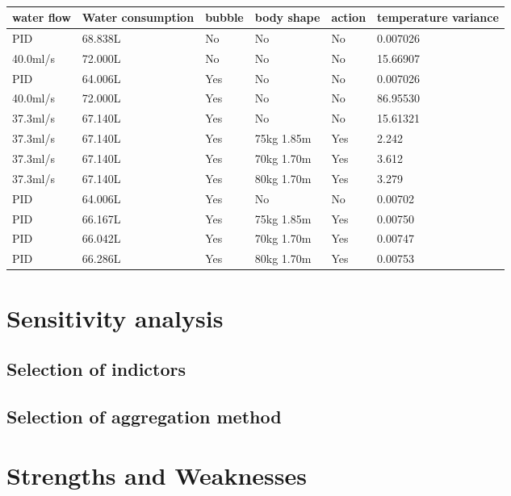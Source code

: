 \documentclass{mcmthesis}
\begin{document}
\begin{table}[H]
	\setlength{\abovecaptionskip}{0pt}
	\setlength{\belowcaptionskip}{0pt}
	\\
	\begin{tabular}{p{2cm}|p{2cm}|p{1.5cm}|p{3cm}|p{1cm}|p{2cm}}
		\hline
		\rowcolor[gray]{0.9}\bf{water flow}	&\bf{Water consumption} &\bf{bubble}&\bf{body shape}&\bf{action}&\bf{temperature variance} \\
		\hline
		PID 	 & 68.838L &No  &No &No &0.007026\\
		40.0ml/s   & 72.000L &No  &No &No &15.66907\\
		\hline
		PID 	 & 64.006L &Yes &No &No &0.007026\\
		40.0ml/s   & 72.000L &Yes &No &No &86.95530\\
		\hline
		37.3ml/s & 67.140L &Yes &No &No &15.61321\\
		37.3ml/s & 67.140L &Yes &75kg 1.85m &Yes &2.242\\	
		37.3ml/s & 67.140L &Yes &70kg 1.70m &Yes &3.612\\
		37.3ml/s & 67.140L &Yes &80kg 1.70m &Yes &3.279\\
		\hline
		PID & 64.006L &Yes &No &No &0.00702\\
		PID & 66.167L &Yes &75kg 1.85m &Yes &0.00750\\	
		PID & 66.042L &Yes &70kg 1.70m &Yes &0.00747\\
		PID & 66.286L &Yes &80kg 1.70m &Yes &0.00753\\
		\hline
	\end{tabular}
\end{table}
\section{Sensitivity analysis}
\subsection{Selection of indictors}%
\subsection{Selection of aggregation method}%
\section{Strengths and Weaknesses}
\end{document}
